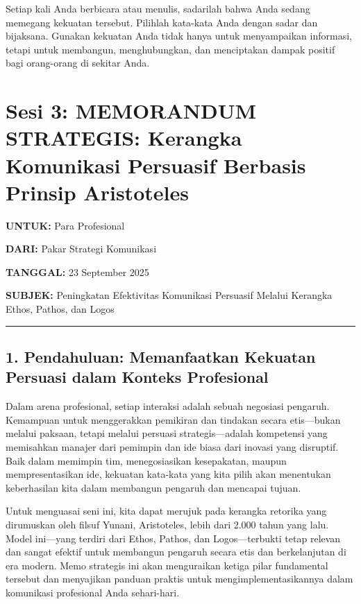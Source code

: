 \documentclass[
  letterpaper,
  DIV=11,
  numbers=noendperiod]{scrreprt}
\begin{document}
Setiap kali Anda berbicara atau menulis, sadarilah bahwa Anda sedang
memegang kekuatan tersebut. Pilihlah kata-kata Anda dengan sadar dan
bijaksana. Gunakan kekuatan Anda tidak hanya untuk menyampaikan
informasi, tetapi untuk membangun, menghubungkan, dan menciptakan dampak
positif bagi orang-orang di sekitar Anda.

\section{Sesi 3: MEMORANDUM STRATEGIS: Kerangka Komunikasi Persuasif
Berbasis Prinsip
Aristoteles}\label{sesi-3-memorandum-strategis-kerangka-komunikasi-persuasif-berbasis-prinsip-aristoteles}

\textbf{UNTUK:} Para Profesional

\textbf{DARI:} Pakar Strategi Komunikasi

\textbf{TANGGAL:} 23 September 2025

\textbf{SUBJEK:} Peningkatan Efektivitas Komunikasi Persuasif Melalui
Kerangka Ethos, Pathos, dan Logos

\begin{center}\rule{0.5\linewidth}{0.5pt}\end{center}

\subsection{\texorpdfstring{\textbf{1. Pendahuluan: Memanfaatkan
Kekuatan Persuasi dalam Konteks
Profesional}}{1. Pendahuluan: Memanfaatkan Kekuatan Persuasi dalam Konteks Profesional}}\label{pendahuluan-memanfaatkan-kekuatan-persuasi-dalam-konteks-profesional}

Dalam arena profesional, setiap interaksi adalah sebuah negosiasi
pengaruh. Kemampuan untuk menggerakkan pemikiran dan tindakan secara
etis---bukan melalui paksaan, tetapi melalui persuasi strategis---adalah
kompetensi yang memisahkan manajer dari pemimpin dan ide biasa dari
inovasi yang disruptif. Baik dalam memimpin tim, menegosiasikan
kesepakatan, maupun mempresentasikan ide, kekuatan kata-kata yang kita
pilih akan menentukan keberhasilan kita dalam membangun pengaruh dan
mencapai tujuan.

Untuk menguasai seni ini, kita dapat merujuk pada kerangka retorika yang
dirumuskan oleh filsuf Yunani, Aristoteles, lebih dari 2.000 tahun yang
lalu. Model ini---yang terdiri dari Ethos, Pathos, dan Logos---terbukti
tetap relevan dan sangat efektif untuk membangun pengaruh secara etis
dan berkelanjutan di era modern. Memo strategis ini akan menguraikan
ketiga pilar fundamental tersebut dan menyajikan panduan praktis untuk
mengimplementasikannya dalam komunikasi profesional Anda sehari-hari.
\end{document}
